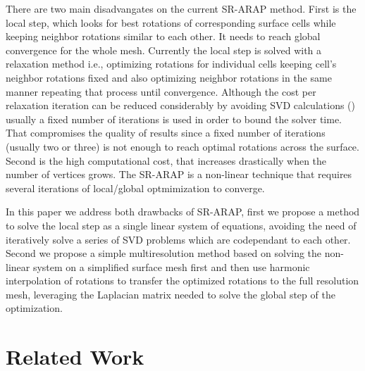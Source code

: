 \documentclass{birkjour}
\numberwithin{equation}{section}
\begin{document}
There are two main disadvangates on the current SR-ARAP method. First is the local step, which looks for best rotations of corresponding surface cells while keeping neighbor rotations similar to each other. It needs to reach global convergence for the whole mesh. Currently the local step is solved with a relaxation method i.e., optimizing rotations for individual cells keeping cell's neighbor rotations fixed and also optimizing neighbor rotations in the same manner repeating that process until convergence. Although the cost per relaxation iteration can be reduced considerably by avoiding SVD calculations (\cite{Ligare2020}) usually a fixed number of iterations is used in order to bound the solver time. That compromises the quality of results since a fixed number of iterations (usually two or three) is not enough to reach optimal rotations across the surface. Second is the high computational cost, that increases drastically when the number of vertices grows. The SR-ARAP is a non-linear technique that requires several iterations of local/global optmimization to converge.

In this paper we address both drawbacks of SR-ARAP, first we propose a method to solve the local step as a single linear system of equations, avoiding the need of iteratively solve a series of SVD problems which are codependant to each other. Second we propose a simple multiresolution method based on solving the non-linear system on a simplified surface mesh first and then use harmonic interpolation of rotations to transfer the optimized rotations to the full resolution mesh, leveraging the Laplacian matrix needed to solve the global step of the optimization.


\section{Related Work}
\end{document}
